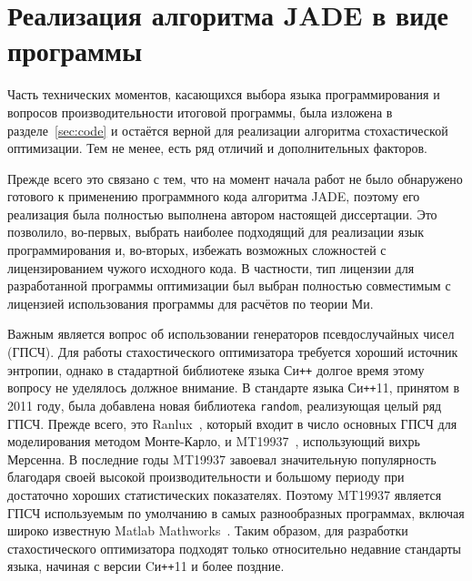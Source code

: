 \section{Реализация алгоритма JADE в виде программы}
\label{sec:jade}

Часть технических моментов, касающихся выбора языка программирования и
вопросов производительности итоговой программы, была изложена в
разделе~\ref{sec:code} и остаётся верной для реализации алгоритма
стохастической оптимизации. Тем не менее, есть ряд отличий и
дополнительных факторов.

Прежде всего это связано с тем, что на момент начала работ не было
обнаружено готового к применению программного кода алгоритма JADE, поэтому его
реализация была полностью выполнена автором настоящей диссертации. Это
позволило, во-первых, выбрать наиболее подходящий для реализации язык
программирования и, во-вторых, избежать возможных сложностей с
лицензированием чужого исходного кода. В частности, тип лицензии для
разработанной программы оптимизации был выбран полностью
совместимым с лицензией использования программы для расчётов по
теории Ми.

Важным является вопрос об использовании генераторов псевдослучайных
чисел (ГПСЧ). Для работы стахостического оптимизатора требуется
хороший источник энтропии, однако в стадартной библиотеке языка
Си\texttt{++} долгое время этому вопросу не уделялось должное
внимание. В стандарте языка Си\texttt{++}11, принятом в 2011 году, была
добавлена новая библиотека \verb+random+, реализующая целый ряд
ГПСЧ. Прежде всего, это Ranlux~\cite{Luscher-RNG-Ranlux-1994}, который
входит в число основных ГПСЧ для моделирования методом Монте-Карло, и
MT19937~\cite{Matsumoto-RNG-MT-1998}, использующий вихрь Мерсенна. В
последние годы MT19937 завоевал значительную популярность благодаря
своей высокой производительности и большому периоду при достаточно
хороших статистических показателях. Поэтому MT19937 является ГПСЧ
используемым по умолчанию в самых разнообразных программах, включая
широко известную Matlab Mathworks~\cite{Matlab-web}. Таким образом, для разработки
стахостического оптимизатора подходят только относительно недавние
стандарты языка, начиная с версии Cи\texttt{++}11 и более поздние.

